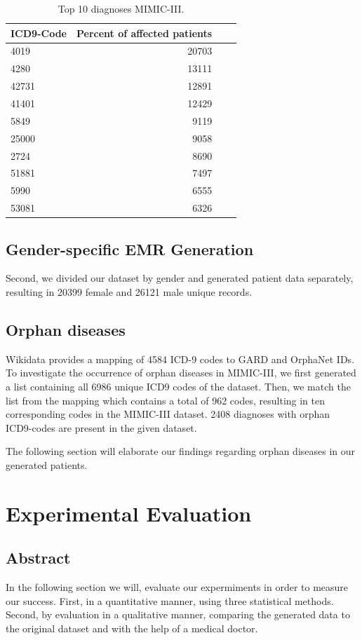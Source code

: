 \documentclass[11pt, a4paper]{book}
\begin{document}
\begin{table}
\begin{tabularx}{\textwidth}{p{}|r|X|r}
\textbf{ICD9-Code} & \textbf{Percent of affected patients}\\
\hline
4019 & 20703\\
4280   & 13111\\
42731    & 12891\\
41401    & 12429\\
5849      & 9119\\
25000     & 9058\\
2724     & 8690\\
51881    & 7497\\
5990     & 6555\\
53081    & 6326\\
\end{tabularx}
\caption{\label{tab:top10-icd-mimic}Top 10 diagnoses MIMIC-III.}
\end{table}


\section{Gender-specific EMR Generation}
Second, we divided our dataset by gender and generated patient data separately, resulting in 20399 female and 26121 male unique records.
\\
\section{Orphan diseases}
Wikidata provides a mapping of 4584 ICD-9 codes to GARD and OrphaNet IDs.
To investigate the occurrence of orphan diseases in MIMIC-III, we first generated a list containing all 6986 unique ICD9 codes of the dataset. Then, we match the list from the mapping which contains a total of 962 codes, resulting in ten corresponding codes in the MIMIC-III dataset. 2408 diagnoses with orphan ICD9-codes are present in the given dataset.

The following section will elaborate our findings regarding orphan diseases in our generated patients.
\chapter{Experimental Evaluation}
\section{Abstract}
In the following section we will, evaluate our expermiments in order to measure our success. First, in a quantitative manner, using three statistical methods. Second, by evaluation in a qualitative manner, comparing the generated data to the original dataset and with the help of a medical doctor.
\end{document}
